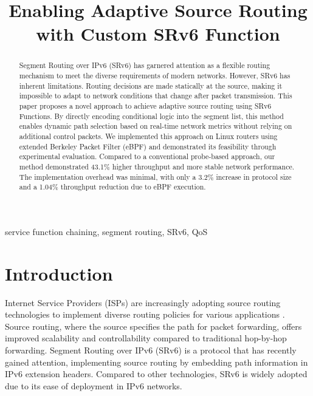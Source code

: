 \documentclass[conference]{IEEEtran}
\begin{document}
\title{Enabling Adaptive Source Routing with Custom SRv6 Function}

\author{
}

\maketitle

\begin{abstract}
  Segment Routing over IPv6 (SRv6) has garnered attention as a flexible routing mechanism to meet the diverse requirements of modern networks.
  However, SRv6 has inherent limitations. Routing decisions are made statically at the source, making it impossible to adapt to network conditions that change after packet transmission.
  This paper proposes a novel approach to achieve adaptive source routing using SRv6 Functions.
  By directly encoding conditional logic into the segment list, this method enables dynamic path selection based on real-time network metrics without relying on additional control packets.
  We implemented this approach on Linux routers using extended Berkeley Packet Filter (eBPF) and demonstrated its feasibility through experimental evaluation.
  Compared to a conventional probe-based approach, our method demonstrated 43.1\% higher throughput and more stable network performance.
  The implementation overhead was minimal, with only a 3.2\% increase in protocol size and a 1.04\% throughput reduction due to eBPF execution.
\end{abstract}

\begin{IEEEkeywords}
  service function chaining, segment routing, SRv6, QoS
\end{IEEEkeywords}

\section{Introduction}

Internet Service Providers (ISPs) are increasingly adopting source routing technologies to implement diverse routing policies for various applications \cite{cisco_rakuten_srv6}\cite{softbank_srv6}.
Source routing, where the source specifies the path for packet forwarding, offers improved scalability and controllability compared to traditional hop-by-hop forwarding.
Segment Routing over IPv6 (SRv6) is a protocol that has recently gained attention, implementing source routing by embedding path information in IPv6 extension headers.
Compared to other technologies, SRv6 is widely adopted due to its ease of deployment in IPv6 networks.
\end{document}
